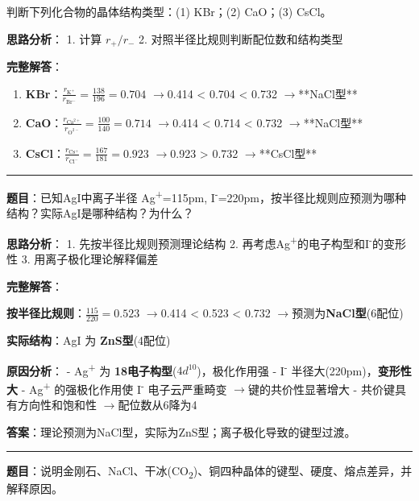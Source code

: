 \documentclass[a4paper,11pt]{ctexart}
\newcommand{\箭}{\ensuremath{\rightarrow}}
\newcommand{\左箭}{\ensuremath{\leftarrow}}
\newcommand{\上箭}{\ensuremath{\uparrow}}
\newcommand{\下箭}{\ensuremath{\downarrow}}
\newcommand{\衡}{\ensuremath{\rightleftharpoons}}
\newcommand{\双箭}{\ensuremath{\leftrightarrow}}
\newcommand{\约等于}{\ensuremath{\approx}}
\newcommand{\小于等于}{\ensuremath{\leq}}
\newcommand{\大于等于}{\ensuremath{\geq}}
\newcommand{\不等于}{\ensuremath{\neq}}
\newcommand{\西格马}{\ensuremath{\sigma}}
\newcommand{\派}{\ensuremath{\pi}}
\begin{document}
判断下列化合物的晶体结构类型：(1) KBr；(2) CaO；(3) CsCl。

\textbf{思路分析}：
1. 计算 \(r_+/r_-\)
2. 对照半径比规则判断配位数和结构类型

\textbf{完整解答}：

\begin{enumerate}
\def\labelenumi{(\arabic{enumi})}
\item
  \textbf{KBr}：\(\frac{r_{\mathrm{K^+}}}{r_{\mathrm{Br^-}}} = \frac{138}{196} = 0.704\) \箭 0.414 \textless{} 0.704 \textless{} 0.732 \箭 **NaCl型**
\item
  \textbf{CaO}：\(\frac{r_{\mathrm{Ca^{2+}}}}{r_{\mathrm{O^{2-}}}} = \frac{100}{140} = 0.714\) \箭 0.414 \textless{} 0.714 \textless{} 0.732 \箭 **NaCl型**
\item
  \textbf{CsCl}：\(\frac{r_{\mathrm{Cs^+}}}{r_{\mathrm{Cl^-}}} = \frac{167}{181} = 0.923\) \箭 0.923 \textgreater{} 0.732 \箭 **CsCl型**
\end{enumerate}

\begin{center}\rule{0.5\linewidth}{0.5pt}\end{center}

\textbf{题目}：已知AgI中离子半径 Ag\textsuperscript{+}=115pm, I\textsuperscript{-}=220pm，按半径比规则应预测为哪种结构？实际AgI是哪种结构？为什么？

\textbf{思路分析}：
1. 先按半径比规则预测理论结构
2. 再考虑Ag\textsuperscript{+}的电子构型和I\textsuperscript{-}的变形性
3. 用离子极化理论解释偏差

\textbf{完整解答}：

\textbf{按半径比规则}：\(\frac{115}{220} = 0.523\) \箭 0.414 \textless{} 0.523 \textless{} 0.732 \箭 预测为\textbf{NaCl型}(6配位)

\textbf{实际结构}：AgI 为 \textbf{ZnS型}(4配位)

\textbf{原因分析}：
- Ag\textsuperscript{+} 为 \textbf{18电子构型}(\(4d^{10}\))，极化作用强
- I\textsuperscript{-} 半径大(220pm)，\textbf{变形性大}
- Ag\textsuperscript{+} 的强极化作用使 I\textsuperscript{-} 电子云严重畸变 \箭 键的共价性显著增大
- 共价键具有方向性和饱和性 \箭 配位数从6降为4

\textbf{答案}：理论预测为NaCl型，实际为ZnS型；离子极化导致的键型过渡。

\begin{center}\rule{0.5\linewidth}{0.5pt}\end{center}

\textbf{题目}：说明金刚石、NaCl、干冰(CO\textsubscript{2})、铜四种晶体的键型、硬度、熔点差异，并解释原因。
\end{document}
